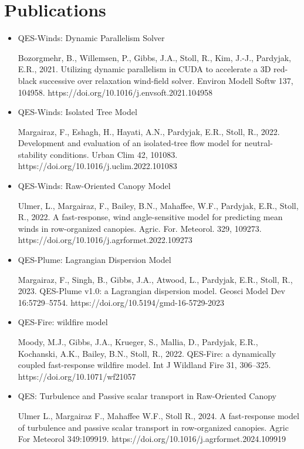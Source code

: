 \section{Publications}

\begin{itemize}

\item QES-Winds: Dynamic Parallelism Solver

Bozorgmehr, B., Willemsen, P., Gibbs, J.A., Stoll, R., Kim, J.-J., Pardyjak, E.R., 2021. Utilizing dynamic parallelism in CUDA to accelerate a 3D red-black successive over relaxation wind-field solver. Environ Modell Softw 137, 104958. https://doi.org/10.1016/j.envsoft.2021.104958

\item QES-Winds: Isolated Tree Model

Margairaz, F., Eshagh, H., Hayati, A.N., Pardyjak, E.R., Stoll, R., 2022. Development and evaluation of an isolated-tree flow model for neutral-stability conditions. Urban Clim 42, 101083. https://doi.org/10.1016/j.uclim.2022.101083

\item QES-Winds: Raw-Oriented Canopy Model

Ulmer, L., Margairaz, F., Bailey, B.N., Mahaffee, W.F., Pardyjak, E.R., Stoll, R., 2022. A fast-response, wind angle-sensitive model for predicting mean winds in row-organized canopies. Agric. For. Meteorol. 329, 109273. https://doi.org/10.1016/j.agrformet.2022.109273

\item QES-Plume: Lagrangian Dispersion Model

Margairaz, F., Singh, B., Gibbs, J.A., Atwood, L., Pardyjak, E.R., Stoll, R., 2023. QES-Plume v1.0: a Lagrangian dispersion model. Geosci Model Dev 16:5729–5754. https://doi.org/10.5194/gmd-16-5729-2023

\item QES-Fire: wildfire model

Moody, M.J., Gibbs, J.A., Krueger, S., Mallia, D., Pardyjak, E.R., Kochanski, A.K., Bailey, B.N., Stoll, R., 2022. QES-Fire: a dynamically coupled fast-response wildfire model. Int J Wildland Fire 31, 306–325. https://doi.org/10.1071/wf21057

\item QES: Turbulence and Passive scalar transport in Raw-Oriented Canopy

Ulmer L., Margairaz F., Mahaffee W.F., Stoll R., 2024. A fast-response model of turbulence and passive scalar transport in row-organized canopies. Agric For Meteorol 349:109919. https://doi.org/10.1016/j.agrformet.2024.109919


\end{itemize}
